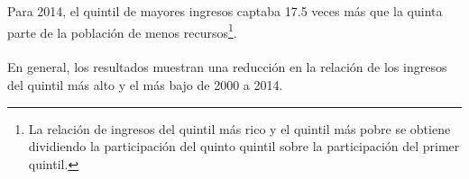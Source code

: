  Para 2014, el quintil de mayores ingresos captaba 17.5 veces más que la quinta parte de la población de menos recursos\footnote{La relación de ingresos del quintil más rico y el quintil más pobre se obtiene dividiendo la participación del quinto quintil  sobre la participación del primer quintil.}.\\\\ En general, los resultados muestran una reducción en la relación de los ingresos del quintil más alto y el más bajo de 2000 a 2014. 